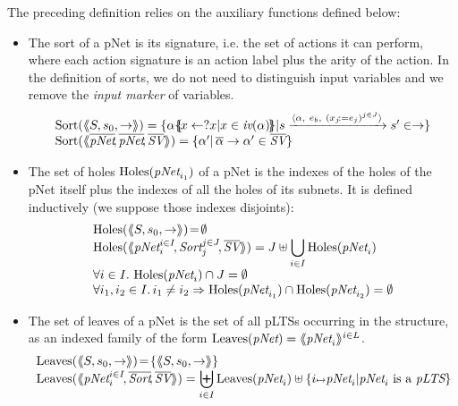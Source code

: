 \documentclass{lncs/llncs}
\begin{document}
The preceding definition relies on the auxiliary functions defined below:

\begin{definition}\label{def-sortholeleave}
  \begin{itemize}
  \item The sort of a pNet is its signature, i.e. the set of actions it can
perform, where each action signature is an action 
label plus the arity of the action. In the definition of sorts, we do not need to 
distinguish
input variables and we remove the
\emph{input marker} of variables.
\[
\begin{array}{l}
\Sortop(\mylangle S,s_0, \to\myrangle) = \{\alpha\subst{x \gets ?x| 
x\in\symb{iv}(\alpha)}|s \xrightarrow{\langle \alpha,~e_b,~(x_j\!:= {e}_j)^{j\in
    J}\rangle} s'\in \to \} \\
\Sortop(\mylangle \overline{\pNet}\!, %
\overline{\pNet}\!,
\overline{\symb{SV}}\myrangle)
=\{\alpha' |\, \overline{\alpha}%
\to\alpha'\in\set{\symb{SV}}\}
\end{array}
\]

\item
The set of holes $\Holes(\pNet_{i_1})$ of a pNet is the indexes of the holes of the pNet 
itself plus the indexes of all the holes of its subnets.
It is defined inductively (we suppose those indexes 
disjoints):
  \[\begin{array}{l}
\Holes(\mylangle S,s_0, \to\myrangle) \!=\! \emptyset\\
\Holes(\mylangle \pNet_i^{i\in I}\!,\Sort_j^{j\in J}\!, \overline{\symb{SV}}\myrangle) 
=J\uplus{\displaystyle \bigcup_{i\in 
I}\Holes(\pNet_i)}\\
\forall i\in I.\, \Holes(\pNet_i)\cap J=\emptyset\\
\forall i_1,i_2\in I.\,i_1\neq i_2\Rightarrow  \Holes(\pNet_{i_1})\cap\Holes(\pNet_{i_2})=\emptyset
\end{array}\]
\item
The set of leaves of a pNet is the set of all pLTSs occurring in the structure, as an 
indexed family of the form $\Leaves(\pNet)= \mylangle \pNet_i \myrangle^{i \in L}$.
\[\begin{array}{l}
\Leaves(\mylangle S,s_0, \to\myrangle) \!=\!\{\mylangle S,s_0, \to\myrangle\}\\
\Leaves(\mylangle \pNet_i^{i\in I}\!,%
\overline{\Sort}\!, \overline{\symb{SV}}\myrangle) = {\displaystyle \biguplus_{i\in 
I}\Leaves(\pNet_i)\uplus\{i\mapsto \pNet_i|\pNet_i \text{ is a }\pLTS\}}
\end{array}\]
\end{itemize}
\end{definition}
  
\end{document}
